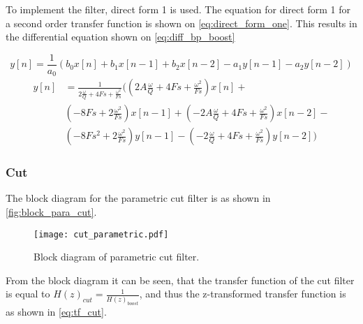 
To implement the filter, direct form 1 is used. The equation for direct form 1 for a second order transfer function is shown on \autoref{eq:direct_form_one}. This results in the differential equation shown on \autoref{eq:diff_bp_boost}
 
\begin{equation}\label{eq:direct_form_one}
y[n]=\frac{1}{a_0}(b_0 x[n]+b_1 x[n-1]+b_2 x[n-2] - a_1 y[n-1]-a_2 y[n-2])
\end{equation}
\begin{equation}\label{eq:diff_bp_boost}
\begin{split}
 y[n] & =\frac{1}{2 \frac{ \omega }{ Q } + 4 Fs + \frac{\omega ^ 2}{Fs}}(( 2 A \frac{ \omega }{ Q } + 4 Fs + \frac{\omega ^ 2}{Fs}) x[n] + \\
 & ( -8 Fs  + 2 \frac{\omega ^ 2}{Fs} ) x[n-1]  +(- 2 A \frac{ \omega } { Q }  + 4 Fs + \frac{\omega ^ 2}{Fs}) x[n-2] - \\ 
 & ( -8 Fs ^ 2 + 2 \frac{\omega ^ 2}{Fs} ) y[n-1] - (- 2 \frac{ \omega } { Q } + 4 Fs + \frac{\omega ^ 2}{Fs}) y[n-2])
\end{split}
\end{equation}

\subsubsection{Cut}
The block diagram for the parametric cut filter is as shown in \autoref{fig:block_para_cut}.
 
\begin{figure}[htbp]
	\centering
	\texttt{[image: cut\_parametric.pdf]}
	\caption{Block diagram of parametric cut filter.}
	\label{fig:block_para_cut}
\end{figure}

From the block diagram it can be seen, that the transfer function of the cut filter is equal to $ {H(z)}_{cut} = \frac{1}{{H(z)}_{boost}} $, and thus the z-transformed transfer function is as shown in \autoref{eq:tf_cut}.

